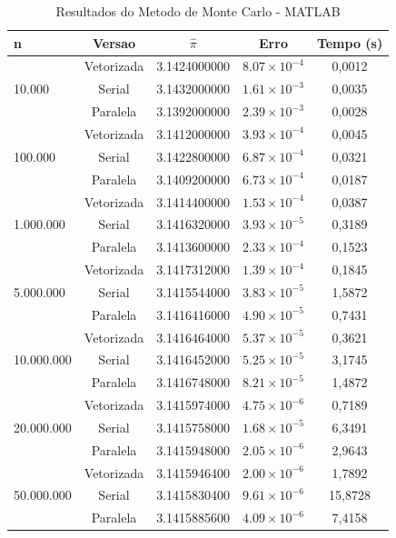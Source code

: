 \documentclass[12pt, a4paper]{article}
\begin{document}
	\begin{table}[H]
		\centering
		\caption{Resultados do Metodo de Monte Carlo - MATLAB}
		\label{tab:matlab_mc}
		\begin{tabular}{lcccc}
			\toprule
			\textbf{n} & \textbf{Versao} & \textbf{$\hat{\pi}$} & \textbf{Erro} & \textbf{Tempo (s)} \\
			\midrule
			\multirow{3}{*}{10.000} & Vetorizada & 3.1424000000 & $8.07\times10^{-4}$ & 0,0012 \\
			& Serial     & 3.1432000000 & $1.61\times10^{-3}$ & 0,0035 \\
			& Paralela   & 3.1392000000 & $2.39\times10^{-3}$ & 0,0028 \\
			\midrule
			\multirow{3}{*}{100.000} & Vetorizada & 3.1412000000 & $3.93\times10^{-4}$ & 0,0045 \\
			& Serial     & 3.1422800000 & $6.87\times10^{-4}$ & 0,0321 \\
			& Paralela   & 3.1409200000 & $6.73\times10^{-4}$ & 0,0187 \\
			\midrule
			\multirow{3}{*}{1.000.000} & Vetorizada & 3.1414400000 & $1.53\times10^{-4}$ & 0,0387 \\
			& Serial     & 3.1416320000 & $3.93\times10^{-5}$ & 0,3189 \\
			& Paralela   & 3.1413600000 & $2.33\times10^{-4}$ & 0,1523 \\
			\midrule
			\multirow{3}{*}{5.000.000} & Vetorizada & 3.1417312000 & $1.39\times10^{-4}$ & 0,1845 \\
			& Serial     & 3.1415544000 & $3.83\times10^{-5}$ & 1,5872 \\
			& Paralela   & 3.1416416000 & $4.90\times10^{-5}$ & 0,7431 \\
			\midrule
			\multirow{3}{*}{10.000.000} & Vetorizada & 3.1416464000 & $5.37\times10^{-5}$ & 0,3621 \\
			& Serial     & 3.1416452000 & $5.25\times10^{-5}$ & 3,1745 \\
			& Paralela   & 3.1416748000 & $8.21\times10^{-5}$ & 1,4872 \\
			\midrule
			\multirow{3}{*}{20.000.000} & Vetorizada & 3.1415974000 & $4.75\times10^{-6}$ & 0,7189 \\
			& Serial     & 3.1415758000 & $1.68\times10^{-5}$ & 6,3491 \\
			& Paralela   & 3.1415948000 & $2.05\times10^{-6}$ & 2,9643 \\
			\midrule
			\multirow{3}{*}{50.000.000} & Vetorizada & 3.1415946400 & $2.00\times10^{-6}$ & 1,7892 \\
			& Serial     & 3.1415830400 & $9.61\times10^{-6}$ & 15,8728 \\
			& Paralela   & 3.1415885600 & $4.09\times10^{-6}$ & 7,4158 \\
			\bottomrule
		\end{tabular}
	\end{table}
	
\end{document}

